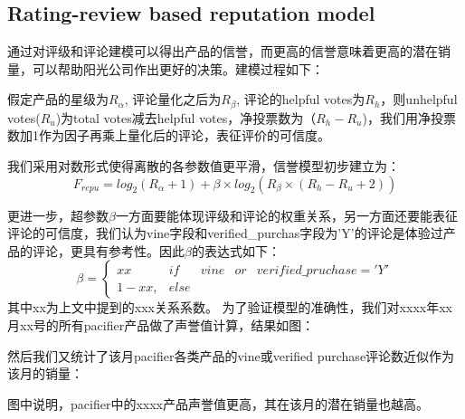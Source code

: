 \documentclass{mcmthesis}
\begin{document}
\subsection{Rating-review based reputation model}
通过对评级和评论建模可以得出产品的信誉，而更高的信誉意味着更高的潜在销量，可以帮助阳光公司作出更好的决策。建模过程如下：

假定产品的星级为$R_{\alpha}$, 评论量化之后为$R_{\beta}$, 评论的helpful votes为$R_{h}$，则unhelpful votes($R_{u}$)为total votes减去helpful votes，净投票数为（$R_{h}-R_{u}$)，我们用净投票数加1作为因子再乘上量化后的评论，表征评价的可信度。

我们采用对数形式使得离散的各参数值更平滑，信誉模型初步建立为：
\begin{equation}
	F_{repu} =  log_2(R_{\alpha}+1)+ \beta \times log_2(R_{\beta}\times(R_{h}-R_{u}+2))
	\label{priA}
\end{equation}

更进一步，超参数$\beta$一方面要能体现评级和评论的权重关系，另一方面还要能表征评论的可信度，我们认为vine字段和verified\_purchas字段为'Y'的评论是体验过产品的评论，更具有参考性。因此$\beta$的表达式如下：
\begin{equation}
	\beta =\left\{\begin{matrix}
xx & if &vine &or &verified\_pruchase = 'Y'\\ 
1-xx,& else
\end{matrix}\right.
\label{hyperbeta}
\end{equation}
其中xx为上文中提到的xxx关系系数。
为了验证模型的准确性，我们对xxxx年xx月xx号的所有pacifier产品做了声誉值计算，结果如图：

然后我们又统计了该月pacifier各类产品的vine或verified purchase评论数近似作为该月的销量：

图中说明，pacifier中的xxxx产品声誉值更高，其在该月的潜在销量也越高。
\end{document}
